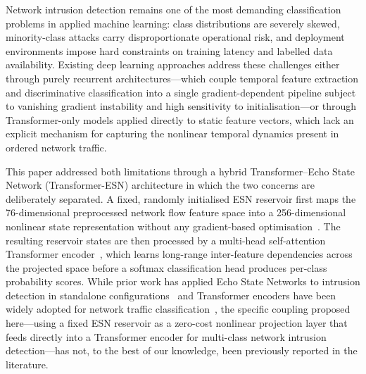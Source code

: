 \documentclass[5p,times]{elsarticle}
\begin{document}
	Network intrusion detection remains one of the most demanding
	classification problems in applied machine learning: class
	distributions are severely skewed, minority-class attacks carry
	disproportionate operational risk, and deployment environments
	impose hard constraints on training latency and labelled data
	availability. Existing deep learning approaches address these challenges either
	through purely recurrent architectures---which couple temporal feature
	extraction and discriminative classification into a single
	gradient-dependent pipeline subject to vanishing gradient instability
	and high sensitivity to initialisation---or through Transformer-only
	models applied directly to static feature vectors, which lack an
	explicit mechanism for capturing the nonlinear temporal dynamics
	present in ordered network traffic.
	
	This paper addressed both limitations through a hybrid
	Transformer--Echo State Network (Transformer-ESN)
	architecture in which the two concerns are deliberately separated.
	A fixed, randomly initialised ESN reservoir first maps the
	76-dimensional preprocessed network flow feature space into a
	256-dimensional nonlinear state representation without any
	gradient-based optimisation~\cite{jaeger2001,lukosevicius2012}.
	The resulting reservoir states are then processed by a multi-head
	self-attention Transformer encoder~\cite{vaswani2017attention},
	which learns long-range inter-feature dependencies across the
	projected space before a softmax classification head produces
	per-class probability scores. While prior work has applied Echo
	State Networks to intrusion detection in standalone
	configurations~\cite{esn_dos2021,mlesn2020,cesn2024} and
	Transformer encoders have been widely adopted for network traffic
	classification~\cite{rtids2022,flowformer2024,long2024transformer},
	the specific coupling proposed here---using a fixed ESN reservoir
	as a zero-cost nonlinear projection layer that feeds directly into
	a Transformer encoder for multi-class network intrusion
	detection---has not, to the best of our knowledge, been previously
	reported in the literature.
	
\end{document}
